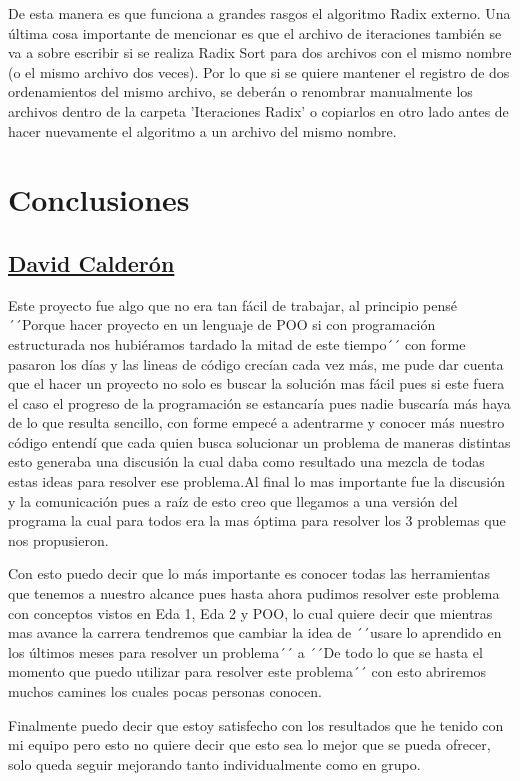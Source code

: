 \documentclass[letter]{report}
\begin{document}
De esta manera es que funciona a grandes rasgos el algoritmo Radix externo. Una última cosa importante de mencionar es que el archivo de iteraciones también se va a sobre escribir si se realiza Radix Sort para dos archivos con el mismo nombre (o el mismo archivo dos veces). Por lo que si se quiere mantener el registro de dos ordenamientos del mismo archivo, se deberán o renombrar manualmente los archivos dentro de la carpeta 'Iteraciones Radix' o copiarlos en otro lado antes de hacer nuevamente el algoritmo a un archivo del mismo nombre.

\clearpage
\section*{Conclusiones}
\subsection*{\underline{David Calderón}}
Este proyecto fue algo que no era tan fácil de trabajar, al principio pensé ´´Porque hacer proyecto en un lenguaje de POO si con programación estructurada nos hubiéramos tardado la mitad de este tiempo´´ con forme pasaron los días y las lineas de código crecían cada vez más, me pude dar cuenta que el hacer un proyecto no solo es buscar la solución mas fácil pues si este fuera el caso el progreso de la programación se estancaría pues nadie buscaría más haya de lo que resulta sencillo, con forme empecé a adentrarme y conocer más nuestro código entendí que cada quien busca solucionar un problema de maneras distintas esto generaba una discusión la cual daba como resultado una mezcla de todas estas ideas para resolver ese problema.Al final lo mas importante fue la discusión y la comunicación pues a raíz de esto creo que llegamos a una versión del programa la cual para todos era la mas óptima para resolver los 3 problemas que nos propusieron.\medskip

Con esto puedo decir que lo más importante es conocer todas las herramientas que tenemos a nuestro alcance pues hasta ahora pudimos resolver este problema con conceptos vistos en Eda 1, Eda 2 y POO, lo cual quiere decir que mientras mas avance la carrera tendremos que cambiar la idea de ´´usare lo aprendido en los últimos meses para resolver un problema´´ a ´´De todo lo que se hasta el momento que puedo utilizar para resolver este problema´´ con esto abriremos muchos camines los cuales pocas personas conocen.\medskip

Finalmente puedo decir que estoy satisfecho con los resultados que he tenido con mi equipo pero esto no quiere decir que esto sea lo mejor que se pueda ofrecer, solo queda seguir mejorando tanto individualmente como en grupo.
\end{document}
